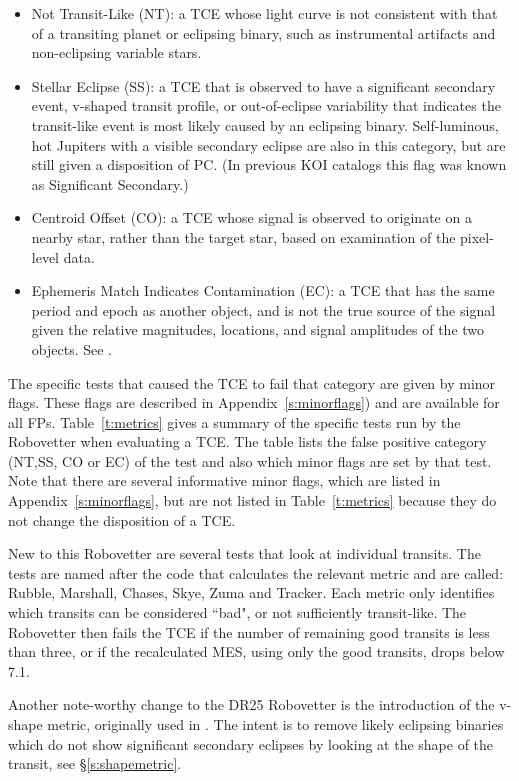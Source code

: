 \begin{itemize}
  \item Not Transit-Like (NT): a TCE whose light curve is not consistent with that of a transiting planet or eclipsing binary, such as instrumental artifacts and non-eclipsing variable stars.
  \item  Stellar Eclipse (SS): a TCE that is observed to have a significant secondary event, v-shaped transit profile, or out-of-eclipse variability that indicates the transit-like event is most likely caused by an eclipsing binary. Self-luminous, hot Jupiters with a visible secondary eclipse are also in this category, but are still given a disposition of PC. (In previous KOI catalogs this flag was known as Significant Secondary.)
  \item Centroid Offset (CO): a TCE whose signal is observed to originate on a nearby star, rather than the target star, based on examination of the pixel-level data.
  \item Ephemeris Match Indicates Contamination (EC): a TCE that has the same period and epoch as another object, and is not the true source of the signal given the relative magnitudes, locations, and signal amplitudes of the two objects. See \citet{Coughlin2014}.
\end{itemize}

The specific tests that caused the TCE to fail that category are given by minor flags. These flags are described in Appendix~\ref{s:minorflags}) and are available for all FPs.  Table~\ref{t:metrics} gives a summary of the specific tests run by the Robovetter when evaluating a TCE.  The table lists the false positive category (NT,SS, CO or EC) of the test and also which minor flags are set by that test.  Note that there are several informative minor flags, which are listed in Appendix~\ref{s:minorflags}, but are not listed in Table~\ref{t:metrics} because they do not change the disposition of a TCE.

New to this Robovetter are several tests that look at individual transits. The tests are named after the code that calculates the relevant metric and are called: Rubble, Marshall, Chases, Skye, Zuma and Tracker.  Each metric only identifies which transits can be considered ``bad", or not sufficiently transit-like.  The Robovetter then fails the TCE if the number of remaining good transits is less than three, or if the recalculated MES, using only the good transits, drops below 7.1.

Another note-worthy change to the DR25 Robovetter is the introduction of the v-shape metric, originally used in \citet{Batalha2013}.  The intent is to remove likely eclipsing binaries which do not show significant secondary eclipses by looking at the shape of the transit, see \S\ref{s:shapemetric}.

